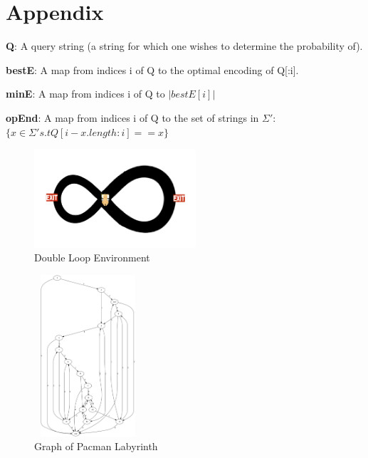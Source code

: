 
\section{Appendix}


\textbf{Q}: A query string (a string for which one wishes to determine the probability of).

\textbf{bestE}: A map from indices i of Q to the optimal encoding of Q[:i].

\textbf{minE}: A map from indices i of Q to $|bestE[i]|$

\textbf{opEnd}: A map from indices i of Q to the set of strings in $\Sigma'$: $\{x \in \Sigma' s.t Q[i-x.length:i] == x\}$


\begin{figure}[ht!]
\centering
\includegraphics[width=60mm]{uCOREPICS/DL/doubleLoopImage.png}
\caption{Double Loop Environment\label{overflow}}
\end{figure}

\begin{figure}[ht!]
\centering
\includegraphics[width=40mm,height=60mm]{uCOREPICS/Pacman/graphPacMan.png}
\caption{Graph of Pacman Labyrinth\label{overflow}}
\end{figure}

